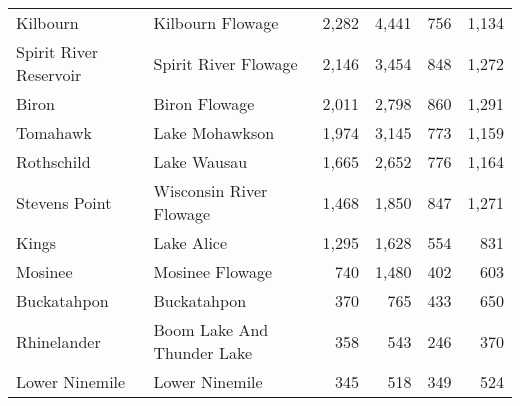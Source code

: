 \begin{table}[h!]
\begin{tabular}{llrrrr}
		Kilbourn                   & Kilbourn Flowage              & 2,282                                & 4,441                                & 756                        & 1,134                      \\
		Spirit River Reservoir     & Spirit River Flowage          & 2,146                                & 3,454                                & 848                        & 1,272                      \\
		Biron                      & Biron Flowage                 & 2,011                                & 2,798                                & 860                        & 1,291                      \\
		Tomahawk                   & Lake Mohawkson                & 1,974                                & 3,145                                & 773                        & 1,159                      \\
		Rothschild                 & Lake Wausau                   & 1,665                                & 2,652                                & 776                        & 1,164                      \\
		Stevens Point              & Wisconsin River Flowage       & 1,468                                & 1,850                                & 847                        & 1,271                      \\
		Kings                      & Lake Alice                    & 1,295                                & 1,628                                & 554                        & 831                        \\
		Mosinee                    & Mosinee Flowage               & 740                                  & 1,480                                & 402                        & 603                        \\
		Buckatahpon                & Buckatahpon                   & 370                                  & 765                                  & 433                        & 650                        \\
		Rhinelander                & Boom Lake And Thunder Lake    & 358                                  & 543                                  & 246                        & 370                        \\
		Lower Ninemile             & Lower Ninemile                & 345                                  & 518                                  & 349                        & 524                        \\

\end{tabular}
\end{table}
